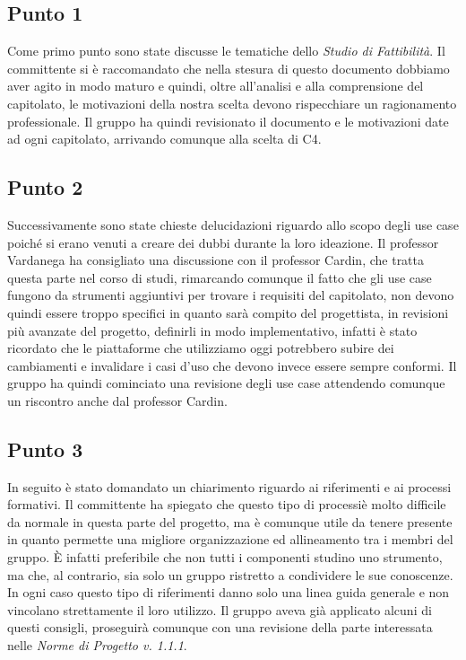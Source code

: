     \subsection{Punto 1}
        Come primo punto sono state discusse le tematiche dello \textit{Studio di Fattibilità}. Il committente si è raccomandato che nella stesura di questo documento dobbiamo aver agito in modo maturo e quindi, oltre all'analisi e alla comprensione del capitolato\glo, le motivazioni della nostra scelta devono rispecchiare un ragionamento professionale. Il gruppo ha quindi revisionato il documento e le motivazioni date ad ogni capitolato\glo, arrivando comunque alla scelta di C4.
    \subsection{Punto 2}
        Successivamente sono state chieste delucidazioni riguardo allo scopo degli use case poiché si erano venuti a creare dei dubbi durante la loro ideazione. Il professor Vardanega ha consigliato una discussione con il professor Cardin, che tratta questa parte nel corso di studi, rimarcando comunque il fatto che gli use case fungono da strumenti aggiuntivi per trovare i requisiti del capitolato\glo, non devono quindi essere troppo specifici in quanto sarà compito del progettista, in revisioni più avanzate del progetto\glo, definirli in modo implementativo, infatti è stato ricordato che le piattaforme che utilizziamo oggi potrebbero subire dei cambiamenti e invalidare i casi d'uso che devono invece essere sempre conformi. Il gruppo ha quindi cominciato una revisione degli use case attendendo comunque un riscontro anche dal professor Cardin.
    \subsection{Punto 3}
        In seguito è stato domandato un chiarimento riguardo ai riferimenti e ai processi formativi. Il committente ha spiegato che questo tipo di processi\glosp è molto difficile da normale in questa parte del progetto\glo, ma è comunque utile da tenere presente in quanto permette una migliore organizzazione ed allineamento tra i membri del gruppo. È infatti preferibile che non tutti i componenti studino uno strumento, ma che, al contrario, sia solo un gruppo ristretto a condividere le sue conoscenze. In ogni caso questo tipo di riferimenti danno solo una linea guida generale e non vincolano strettamente il loro utilizzo. Il gruppo aveva già applicato alcuni di questi consigli, proseguirà comunque con una revisione della parte interessata nelle \textit{Norme di Progetto v. 1.1.1}.
